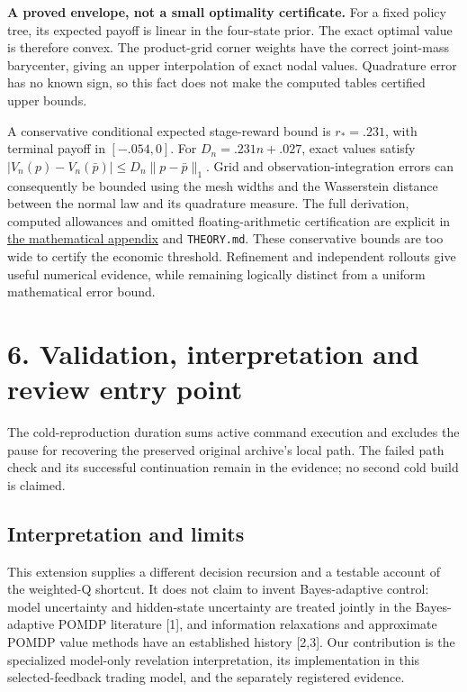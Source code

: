 \documentclass[10pt,a4paper]{article}
\begin{document}


\textbf{A proved envelope, not a small optimality certificate.}
For a fixed policy tree, its expected payoff is linear in the four-state prior.
The exact optimal value is therefore convex. The product-grid corner weights
have the correct joint-mass barycenter, giving an upper interpolation of exact
nodal values. Quadrature error has no known sign, so this fact does not make the
computed tables certified upper bounds.

A conservative conditional expected stage-reward bound is $r_*=.231$, with
terminal payoff in $[-.054,0]$. For $D_n=.231n+.027$, exact values satisfy
$|V_n(p)-V_n(\bar p)|\le D_n\|p-\bar p\|_1$. Grid and observation-integration
errors can consequently be bounded using the mesh widths and the Wasserstein
distance between the normal law and its quadrature measure. The full derivation,
computed allowances and omitted floating-arithmetic certification are explicit
in \href{Mathematical_Appendix.pdf}{the mathematical appendix} and
\texttt{THEORY.md}. These conservative bounds are too wide to certify the
economic threshold. Refinement and independent rollouts give useful numerical
evidence, while remaining logically distinct from a uniform mathematical error bound.

\newpage
\section*{6. Validation, interpretation and review entry point}

The cold-reproduction duration sums active command execution and excludes the
pause for recovering the preserved original archive's local path. The failed
path check and its successful continuation remain in the evidence; no second
cold build is claimed.

\subsection*{Interpretation and limits}
This extension supplies a different decision recursion and a testable account of
the weighted-Q shortcut. It does not claim to invent Bayes-adaptive control:
model uncertainty and hidden-state uncertainty are treated jointly in the
Bayes-adaptive POMDP literature [1], and information relaxations and approximate
POMDP value methods have an established history [2,3]. Our contribution is the
specialized model-only revelation interpretation, its implementation in this
selected-feedback trading model, and the separately registered evidence.
\end{document}
